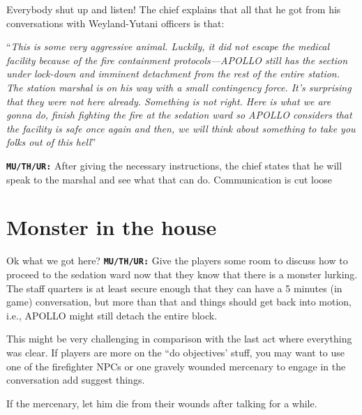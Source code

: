 \begin{rpg-commentbox}{Everybody shut up and listen!}
   The chief explains that all that he got from his conversations with Weyland-Yutani officers is that:
   
   ``\textit{This is some very aggressive animal. Luckily, it did not escape the medical facility because of the fire containment protocols---APOLLO still has the section under lock-down and imminent detachment from the rest of the entire station. The station marshal is on his way with a small contingency force. It's surprising that they were not here already. Something is not right. Here is what we are gonna do, finish fighting the fire at the sedation ward so APOLLO considers that the facility is safe once again and then, we will think about something to take you folks out of this hell}''

   \texttt{\textbf{MU/TH/UR:}} After giving the necessary instructions, the chief states that he will speak to the marshal and see what that can do. Communication is cut loose 
\end{rpg-commentbox}



\clearpage


\section{Monster in the house}

\begin{rpg-commentbox}{Ok what we got here?}
   \texttt{\textbf{MU/TH/UR:}} Give the players some room to discuss how to proceed to the sedation ward now that they know that there is a monster lurking. The staff quarters is at least secure enough that they can have a 5 minutes (in game) conversation, but more than that and things should get back into motion, i.e., APOLLO might still detach the entire block.

   This might be very challenging in comparison with the last act where everything was clear. If players are more on the ``do objectives' stuff, you may want to use one of the firefighter NPCs or one gravely wounded mercenary to engage in the conversation add suggest things. 

   If the mercenary, let him die from their wounds after talking for a while.
\end{rpg-commentbox}




